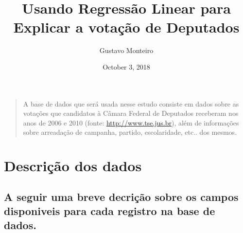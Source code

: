 \documentclass[]{article}
\title{Usando Regressão Linear para Explicar a votação de Deputados}
\author{Gustavo Monteiro}
\date{October 3, 2018}
\begin{document}
\maketitle

{
\setcounter{tocdepth}{2}
\tableofcontents
}
\begin{quote}
A base de dados que será usada nesse estudo consiste em dados sobre as
votações que candidatos à Câmara Federal de Deputados receberam nos anos
de 2006 e 2010 (fonte: \url{http://www.tse.jus.br}), além de informações
sobre arreadação de campanha, partido, escolaridade, etc.. dos mesmos.
\end{quote}

\section{Descrição dos dados}\label{descricao-dos-dados}

\subsection{A seguir uma breve decrição sobre os campos disponiveis para
cada registro na base de
dados.}\label{a-seguir-uma-breve-decricao-sobre-os-campos-disponiveis-para-cada-registro-na-base-de-dados.}
\end{document}
